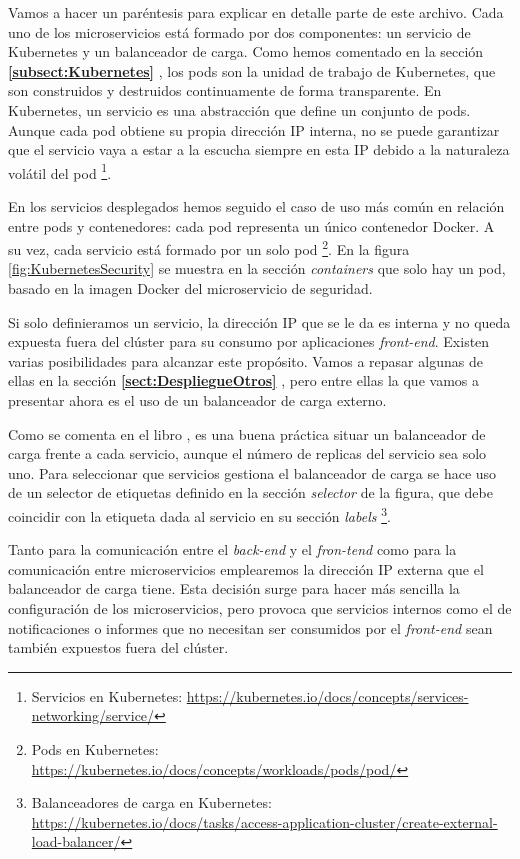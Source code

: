 \documentclass[11pt,spanish,listoffigures]{tfgetsinf}
\begin{document}
Vamos a hacer un paréntesis para explicar en detalle parte de este archivo. Cada uno de los microservicios está formado por dos componentes: un servicio de Kubernetes y un balanceador de carga. Como hemos comentado en la sección \textbf{\ref{subsect:Kubernetes} }, los pods son la unidad de trabajo de Kubernetes, que son construidos y destruidos continuamente de forma transparente. En Kubernetes, un servicio es una abstracción que define un conjunto de pods. Aunque cada pod obtiene su propia dirección IP interna, no se puede garantizar que el servicio vaya a estar a la escucha siempre en esta IP debido a la naturaleza volátil del pod \footnote{ Servicios en Kubernetes: \url{https://kubernetes.io/docs/concepts/services-networking/service/}}.

En los servicios desplegados hemos seguido el caso de uso más común en relación entre pods y contenedores: cada pod representa un único contenedor Docker. A su vez, cada servicio está formado por un solo pod \footnote{ Pods en Kubernetes: \url{https://kubernetes.io/docs/concepts/workloads/pods/pod/}}. En la figura \ref{fig:KubernetesSecurity} se muestra en la sección \textit{containers} que solo hay un pod, basado en la imagen Docker del microservicio de seguridad.

Si solo definieramos un servicio, la dirección IP que se le da es interna y no queda expuesta fuera del clúster para su consumo por aplicaciones \textit{front-end}. Existen varias posibilidades para alcanzar este propósito. Vamos a repasar algunas de ellas en la sección \textbf{\ref{sect:DespliegueOtros} }, pero entre ellas la que vamos a presentar ahora es el uso de un balanceador de carga externo. 

Como se comenta en el libro \cite{Rensin2015}, es una buena práctica situar un balanceador de carga frente a cada servicio, aunque el número de replicas del servicio sea solo uno. Para seleccionar que servicios gestiona el balanceador de carga se hace uso de un selector de etiquetas definido en la sección \textit{selector} de la figura, que debe coincidir con la etiqueta dada al servicio en su sección \textit{labels} \footnote{ Balanceadores de carga en Kubernetes: \url{https://kubernetes.io/docs/tasks/access-application-cluster/create-external-load-balancer/}}.

Tanto para la comunicación entre el \textit{back-end} y el \textit{fron-tend} como para la comunicación entre microservicios emplearemos la dirección IP externa que el balanceador de carga tiene. Esta decisión surge para hacer más sencilla la configuración de los microservicios, pero provoca que servicios internos como el de notificaciones o informes que no necesitan ser consumidos por el \textit{front-end} sean también expuestos fuera del clúster.
\end{document}
